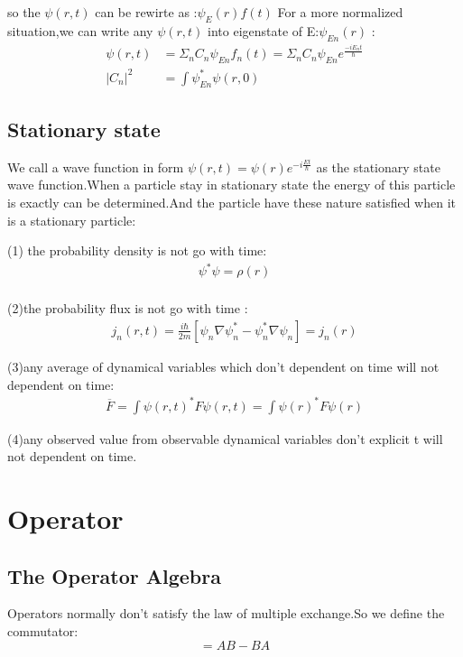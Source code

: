 \documentclass{article}
\begin{document}
so the $\psi(r,t)$ can be rewirte as :$\psi_E(r)f(t)$ For a more normalized situation,we can write any $\psi(r,t)$ into eigenstate of E:$\psi_{En}(r)$ :
\begin{align}
  \psi(r,t)&=\Sigma_n C_n\psi_{En}f_n(t)=\Sigma_n C_n\psi_{En}e^{\frac{-iE_nt}{\hbar}} \\
  |C_n|^2&=\int \psi_{En}^*\psi(r,0)
\end{align}

\subsection{Stationary state}

We call a wave function in form $\psi(r,t)=\psi(r)e^{-i\frac{Et}{\hbar}}$ as the stationary state wave function.When a particle stay in stationary state the energy of this particle is exactly can be determined.And the particle have these nature satisfied when it is a stationary particle:

(1) the probability density is not go with time:
\begin{align}
   \psi^*\psi=\rho(r) \\
\end{align}

  (2)the probability flux is not go with time :
  \begin{align}
    j_n(r,t)=\frac{i\hbar}{2m}[\psi_n\nabla\psi_n^*-\psi_n^*\nabla\psi_n]=j_n(r)
  \end{align}

  (3)any average of dynamical variables which don't dependent on time will not dependent on time:
  \begin{align}
\overline F=\int \psi(r,t)^*F\psi(r,t)=\int \psi(r)^*F\psi(r)
  \end{align}

  (4)any observed value from observable dynamical variables don't explicit t will not dependent on time.
  \section{Operator}

  \subsection{The Operator Algebra}

  Operators normally don't satisfy the law of multiple exchange.So we define the commutator:
  \begin{equation}
    [A,B]=AB-BA
  \end{equation}
\end{document}
